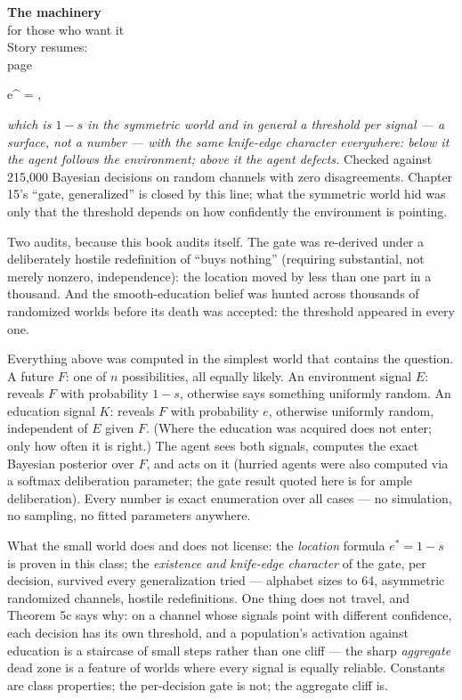 \begin{machinery}{\textbf{The machinery}\\for those who want it\\[3pt]{\color{muted}Story resumes:\\page~\pageref{ch6}}}
\begin{dispmath}e^{\ast} = ,\end{dispmath}

\noindent \emph{which is \(1-s\) in the symmetric world and in general a threshold per
signal --- a surface, not a number --- with the same knife-edge character
everywhere: below it the agent follows the environment; above it the
agent defects.} Checked against 215,000 Bayesian decisions on random
channels with zero disagreements. Chapter 15's ``gate, generalized'' is
closed by this line; what the symmetric world hid was only that the
threshold depends on how confidently the environment is pointing.

Two audits, because this book audits itself. The gate was re-derived
under a deliberately hostile redefinition of ``buys nothing'' (requiring
substantial, not merely nonzero, independence): the location moved by
less than one part in a thousand. And the smooth-education belief was
hunted across thousands of randomized worlds before its death was
accepted: the threshold appeared in every one. 


Everything above was computed in the simplest world that contains the
question. A future \(F\): one of \(n\) possibilities, all equally likely. An environment signal \(E\): reveals \(F\) with probability \(1-s\), otherwise says something uniformly random. An education signal \(K\): reveals \(F\) with probability \(e\), otherwise uniformly random, independent of \(E\) given \(F\).
(Where the education was acquired does not enter; only how often it is
right.) The agent sees both signals, computes the exact Bayesian posterior over \(F\), and acts on it (hurried agents were also computed via a softmax
deliberation parameter; the gate result quoted here is for ample
deliberation). Every number is exact enumeration over all cases --- no
simulation, no sampling, no fitted parameters anywhere.

What the small world does and does not license: the \emph{location} formula \(e^{\ast} = 1-s\) is proven in this class; the \emph{existence and knife-edge
character} of the gate, per decision, survived every generalization
tried --- alphabet sizes to 64, asymmetric randomized channels, hostile
redefinitions. One thing does not travel, and Theorem 5c says why: on a
channel whose signals point with different confidence, each decision
has its own threshold, and a population's activation against education
is a staircase of small steps rather than one cliff --- the sharp
\emph{aggregate} dead zone is a feature of worlds where every signal is
equally reliable. Constants are class properties; the per-decision gate
is not; the aggregate cliff is.

\end{machinery}

